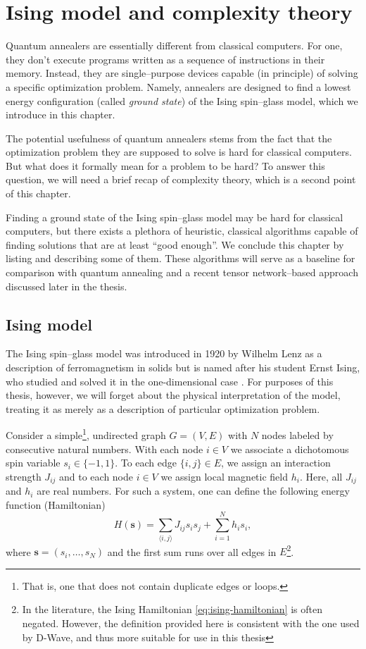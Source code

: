 \chapter{Ising model and complexity theory}


Quantum annealers are essentially different from classical computers. For one, they don't
execute programs written as a sequence of instructions in their memory. Instead, they are
single--purpose devices capable (in principle) of solving a specific optimization problem.
Namely, annealers are designed to find a lowest energy configuration (called \emph{ground state})
of the Ising spin--glass model, which we introduce in this chapter.

The potential usefulness of quantum annealers stems from the fact that the optimization problem they
are supposed to solve is hard for classical computers. But what does it formally mean for a problem
to be hard? To answer this question, we will need a brief recap of complexity theory, which is a
second point of this chapter.

Finding a ground state of the Ising spin--glass model may be hard for classical computers, but
there exists a plethora of heuristic, classical algorithms capable of finding solutions that are at
least ``good enough''. We conclude this chapter by listing and describing some of them.
These algorithms will serve as a baseline for comparison with quantum annealing and a recent
tensor network--based approach discussed later in the thesis.

\section{Ising model}

The Ising spin--glass model was introduced in 1920 by Wilhelm Lenz \cite{lenz} as a description of
ferromagnetism in solids but is named after his student Ernst Ising, who studied and solved it in
the one-dimensional case \cite{ising}. For purposes of this thesis, however, we will forget about
the physical interpretation of the model, treating it as merely as a description of particular
optimization problem.

Consider a simple\footnote{That is, one that does not contain duplicate edges or loops.}, undirected
graph $G = (V, E)$ with $N$ nodes labeled by consecutive natural numbers.  With each node $i \in V$
we associate a dichotomous spin variable $s_i \in \{-1, 1\}$. To each edge $\{i, j\} \in E$, we
assign an interaction strength $J_{ij}$ and to each node $i \in V$ we assign local magnetic field
$h_i$. Here, all $J_{ij}$ and $h_i$ are real numbers. For such a system, one can define the
following energy function (Hamiltonian)
\begin{equation}
\label{eq:ising-hamiltonian}
H(\mathbf{s}) = \sum_{\langle i, j \rangle} J_{ij} s_i s_j +  \sum_{i=1}^N h_i s_i,
\end{equation}
where $\mathbf{s} = (s_i, \ldots, s_N)$ and the first sum runs over all edges in $E$\footnote{In the
literature, the Ising Hamiltonian \eqref{eq:ising-hamiltonian} is often negated. However, the
definition provided here is consistent with the one used by D-Wave, and thus more suitable for use
in this thesis}.

